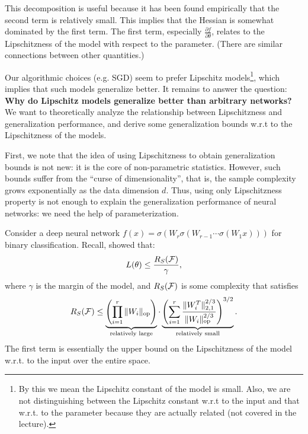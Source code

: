 This decomposition is useful because it has been found empirically that the second term is relatively small. This implies that the Hessian is somewhat dominated by the first term. The first term, especially $\frac{\partial  f}{\partial \theta}$, relates to the Lipschitzness of the model with respect to the parameter. (There are similar connections between other quantities.)

Our algorithmic choices (e.g. SGD) seem to prefer Lipschitz models\footnote{By this we mean the Lipschitz constant of the model is small. Also, we are not distinguishing between the Lipschitz constant w.r.t to the input and that w.r.t. to the parameter because they are actually related (not covered in the lecture).}, which implies that such models generalize better. It remains to answer the question: \textbf{Why do Lipschitz models generalize better than arbitrary networks?} We want to theoretically analyze the relationship between Lipschitzness and generalization performance, and derive some generalization bounds w.r.t to the Lipschitzness of the models.

First, we note that the idea of using Lipschitzness to obtain generalization bounds is not new: it is the core of non-parametric statistics. However, such bounds suffer from the ``curse of dimensionality'', that is, the sample complexity grows exponentially as the data dimension $d$. Thus, using only Lipschitzness property is not enough to explain the generalization performance of neural networks: we need the help of parameterization. 

Consider a deep neural network $f(x) = \sigma(W_r\sigma(W_{r-1}\cdots \sigma(W_1x)))$ for binary classification. Recall, \cite{bartlett2017} showed that:
\begin{equation}
L(\theta) \leq \frac{R_S (\mathcal F) }{\gamma},
\end{equation}
where $\gamma$ is the margin of the model, and $R_S (\mathcal F)$ is some complexity that satisfies
\begin{equation}
R_S (\mathcal F) \leq \underbrace{\left(\prod_{i=1}^r\|W_i\|_{\textup{op}} \right)}_{\text{relatively large}} \cdot \underbrace{\left( \sum_{i=1}^r\frac{\|W_i^T\|^{2/3}_{2,1}}{\|W_i\|_{\textup{op}}^{2/3}}\right)^{3/2}}_{\text{relatively small}}.
\end{equation}
The first term is essentially the upper bound on the Lipschitzness of the model w.r.t. to the input over the entire space. 

